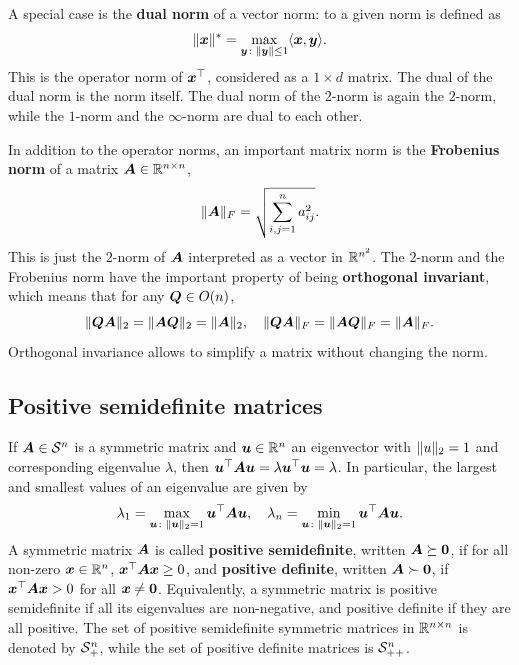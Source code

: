 A special case is the \textbf{dual norm} of a vector norm:
to a given norm is defined as
\begin{equation*}
 \Vert {\bm{x}}\Vert^* = \max_{\bm{y}\colon \Vert {\bm{y}}\Vert\leq 1} \langle {\bm{x}}, {\bm{y}} \rangle.
\end{equation*}
This is the operator norm of $\bm{x}^{\top}$, considered as a $1\times d$ matrix. The dual of the dual norm is the norm itself.
The dual norm of the $2$-norm is again the $2$-norm, while the $1$-norm and the $\infty$-norm are dual to each other.

In addition to the operator norms, an important matrix norm is the \textbf{Frobenius norm} of a matrix $\bm{A}\in \mathbb{R}^{n\times n}$, 
\begin{equation*}
 \Vert {\bm{A}}\Vert_{F} = \sqrt{\sum_{i,j=1}^n a_{ij}^2}.
\end{equation*}
This is just the $2$-norm of $\bm{A}$ interpreted as a vector in $\mathbb{R}^{n^2}$. The $2$-norm and the Frobenius norm have the important property of being \textbf{orthogonal invariant},
which means that for any $\bm{Q}\in O(n)$,
\begin{equation*}
 \Vert {\bm{Q}\bm{A}}\Vert_2 = \Vert {\bm{A}\bm{Q}}\Vert_2 = \Vert {\bm{A}}\Vert_2, \quad \Vert {\bm{Q}\bm{A}}\Vert_F = \Vert {\bm{A}\bm{Q}}\Vert_F = \Vert {\bm{A}}\Vert_F.
\end{equation*}
Orthogonal invariance allows to simplify a matrix without changing the norm.

\subsection{Positive semidefinite matrices}
If $\bm{A}\in \mathcal{S}^n$ is a symmetric matrix and $\bm{u}\in \mathbb{R}^n$ an eigenvector with $\Vert {u}\Vert_2=1$ and corresponding eigenvalue $\lambda$, then $
 \bm{u}^{\top}\bm{A}\bm{u} = \lambda \bm{u}^{\top}\bm{u} = \lambda$.
In particular, the largest and smallest values of an eigenvalue are given by
\begin{equation*}
 \lambda_1 = \max_{\bm{u}\colon \Vert {\bm{u}}\Vert_2=1} \bm{u}^{\top}\bm{A}\bm{u}, \quad \lambda_n = \min_{\bm{u}\colon \Vert {\bm{u}}\Vert_2=1} \bm{u}^{\top}\bm{A}\bm{u}.
\end{equation*}
A symmetric matrix $\bm{A}$ is called \textbf{positive semidefinite}, written $\bm{A}\succeq \bm{0}$, if for all non-zero $\bm{x}\in \mathbb{R}^n$, $\bm{x}^{\top}\bm{A}\bm{x}\geq 0$, and \textbf{positive definite}, written $\bm{A}\succ \bm{0}$, if $\bm{x}^{\top}\bm{A}\bm{x}>0$ for all $\bm{x}\neq \bm{0}$. Equivalently, a symmetric matrix is positive semidefinite if all its eigenvalues are non-negative, and positive definite if they are all positive.
The set of positive semidefinite symmetric matrices in $\mathbb{R}^{n\times n}$ is denoted by $\mathcal{S}_+^n$, while the set of positive definite matrices is $\mathcal{S}_{++}^n$. 


